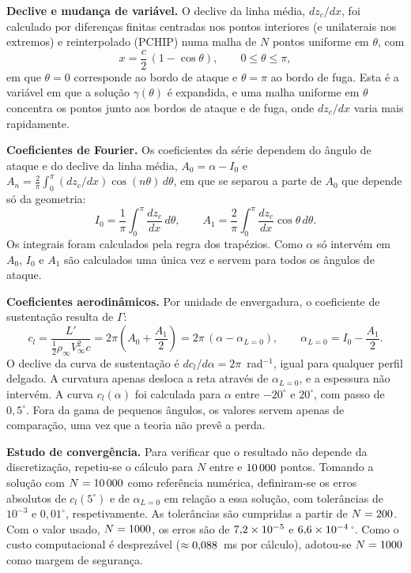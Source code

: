 \begin{etapas}[resume]
  \item \textbf{Declive e mudança de variável.} O declive da linha média,
  $dz_c/dx$, foi calculado por diferenças finitas centradas nos pontos
  interiores (e unilaterais nos extremos) e reinterpolado (PCHIP) numa malha
  de $N$ pontos uniforme em $\theta$, com
  \[
    x = \frac{c}{2}\,(1 - \cos\theta), \qquad 0 \le \theta \le \pi ,
  \]
  em que $\theta = 0$ corresponde ao bordo de ataque e $\theta = \pi$ ao bordo
  de fuga. Esta é a variável em que a solução $\gamma(\theta)$ é expandida, e
  uma malha uniforme em $\theta$ concentra os pontos junto aos bordos de
  ataque e de fuga, onde $dz_c/dx$ varia mais rapidamente.
  \item \textbf{Coeficientes de Fourier.} Os coeficientes da série dependem
  do ângulo de ataque e do declive da linha média, $A_0 = \alpha - I_0$ e
  $A_n = \tfrac{2}{\pi}\int_0^{\pi} (dz_c/dx)\cos(n\theta)\,d\theta$, em que
  se separou a parte de $A_0$ que depende só da geometria:
  \[
    I_0 = \frac{1}{\pi}\int_0^{\pi} \frac{dz_c}{dx}\,d\theta, \qquad
    A_1 = \frac{2}{\pi}\int_0^{\pi} \frac{dz_c}{dx}\cos\theta\,d\theta .
  \]
  Os integrais foram calculados pela regra dos trapézios. Como $\alpha$ só
  intervém em $A_0$, $I_0$ e $A_1$ são calculados uma única vez e servem para
  todos os ângulos de ataque.
  \item \textbf{Coeficientes aerodinâmicos.} Por unidade de envergadura, o
  coeficiente de sustentação resulta de $\Gamma$:
  \[
    c_l = \frac{L'}{\tfrac{1}{2}\rho_\infty V_\infty^2 c}
        = 2\pi\left(A_0 + \frac{A_1}{2}\right) = 2\pi\,(\alpha - \alpha_{L=0}),
    \qquad \alpha_{L=0} = I_0 - \frac{A_1}{2}.
  \]
  O declive da curva de sustentação é $dc_l/d\alpha = 2\pi$~rad$^{-1}$, igual
  para qualquer perfil delgado. A curvatura apenas desloca a reta através de
  $\alpha_{L=0}$, e a espessura não intervém. A curva $c_l(\alpha)$ foi
  calculada para $\alpha$ entre $-20^\circ$ e $20^\circ$, com passo de
  $0{,}5^\circ$. Fora da gama de pequenos ângulos, os valores servem apenas
  de comparação, uma vez que a teoria não prevê a perda.
  \item \textbf{Estudo de convergência.} Para verificar que o resultado não
  depende da discretização, repetiu-se o cálculo para $N$ entre \NMinTestePerfisDelgados{} e
  $\Resultado[0]{\NRefPerfisDelgados}$ pontos. Tomando a solução com $N = \Resultado[0]{\NRefPerfisDelgados}$ como referência
  numérica, definiram-se os erros absolutos de $c_l(5^\circ)$ e de
  $\alpha_{L=0}$ em relação a essa solução,
  com tolerâncias de $10^{-3}$ e $0{,}01^\circ$, respetivamente. As
  tolerâncias são cumpridas a partir de $N = 200$. Com o valor usado,
  $N = 1000$, os erros são de $\ResultadoCientifico{\ErroClPerfisDelgados}$ e
  $\ResultadoCientifico{\ErroAlphaPerfisDelgados}$\,$^\circ$. Como o custo computacional é desprezável
  ($\approx \Resultado[3]{\TempoPerfisDelgadosMs}$~ms por cálculo), adotou-se $N = 1000$ como margem de
  segurança.
\end{etapas}


